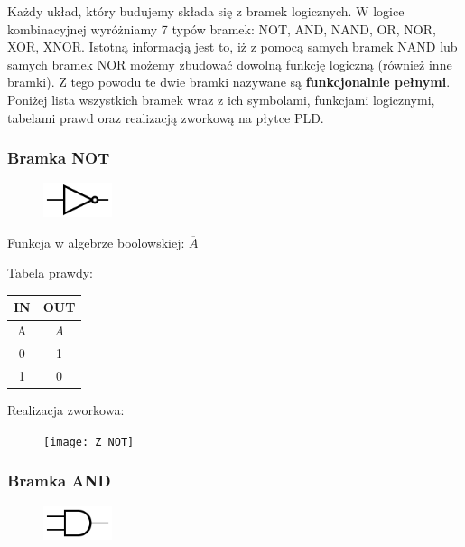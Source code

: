 \documentclass[a4paper,12pt]{article}
\begin{document}
\begin{justify}
Każdy układ, który budujemy składa się z bramek logicznych. W logice kombinacyjnej wyróżniamy 7 typów bramek: NOT, AND, NAND, OR, NOR, XOR, XNOR. Istotną informacją jest to, iż z pomocą samych bramek NAND lub samych bramek NOR możemy zbudować dowolną funkcję logiczną (również inne bramki). Z tego powodu te dwie bramki nazywane są \textbf{funkcjonalnie pełnymi}. Poniżej lista wszystkich bramek wraz z ich symbolami, funkcjami logicznymi, tabelami prawd oraz realizacją zworkową na płytce PLD.

\newpage

\subsubsection{Bramka NOT}

\begin{figure}[h!]
\centering
\includegraphics[width=2cm, height=1cm]{NOT}
\end{figure}

Funkcja w algebrze boolowskiej: $\overline{A}$

Tabela prawdy:

\begin{table}[h!]
\begin{center}
\begin{scriptsize}
\begin{tabular}{|c|c|}
\hline
IN & OUT  \\
\hline
A & $\overline{A}$ \\
\hline
0 & 1 \\
1 & 0 \\
\hline
\end{tabular}
\end{scriptsize}
\end{center}
\end{table}

Realizacja zworkowa:

\begin{figure}[h!]
\centering
\texttt{[image: Z\_NOT]}
\end{figure}

\subsubsection{Bramka AND}

\begin{figure}[h!]
\centering
\includegraphics[width=2cm, height=1cm]{AND}
\end{figure}


\end{justify}
\end{document}
